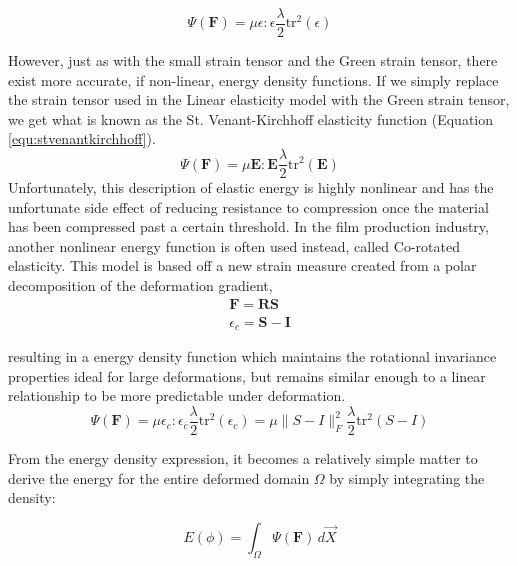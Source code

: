 \begin{equation}
  \label{equ:linearelasticity}
  \Psi(\mathbf{F}) = \mu \epsilon : \epsilon \frac \lambda 2 \text{tr}^2(\epsilon)
\end{equation}

However, just as with the small strain tensor and the Green strain
tensor, there exist more accurate, if non-linear, energy density
functions. If we simply replace the strain tensor used in the Linear
elasticity model with the Green strain tensor, we get what is known as
the St. Venant-Kirchhoff elasticity function (Equation
\ref{equ:stvenantkirchhoff}).
\begin{equation}
  \label{equ:stvenantkirchhoff}
  \Psi(\mathbf{F}) = \mu \mathbf{E} : \mathbf{E} \frac \lambda 2
  \text{tr}^2(\mathbf E)
\end{equation}
Unfortunately, this description of elastic energy is highly nonlinear
and has the unfortunate side effect of reducing resistance to
compression once the material has been compressed past a certain
threshold. In the film production industry, another nonlinear energy
function is often used instead, called Co-rotated elasticity. This
model is based off a new strain measure created from a polar
decomposition of the deformation gradient,
\begin{gather*}
\mathbf F = \mathbf R\mathbf S\\
\epsilon_c = \mathbf S - \mathbf I
\end{gather*}

resulting in a energy density function which maintains the rotational
invariance properties ideal for large deformations, but remains
similar enough to a linear relationship to be more predictable under deformation. 
\begin{equation}
  \label{equ:corotatedelasticity}
   \Psi(\mathbf{F}) = \mu \epsilon_c : \epsilon_c \frac \lambda 2
   \text{tr}^2(\epsilon_c) = \mu \lVert S - I \rVert^2_F \frac \lambda 2
   \text{tr}^2(S-I)
\end{equation}

From the energy density expression, it becomes a relatively simple
matter to derive the energy for the entire deformed domain $\Omega$ by simply
integrating the density:

\begin{equation}
  \label{equ:systemenergy}
  E(\phi) = \int_\Omega \Psi( \mathbf F ) \,d\vec{X}
\end{equation}


